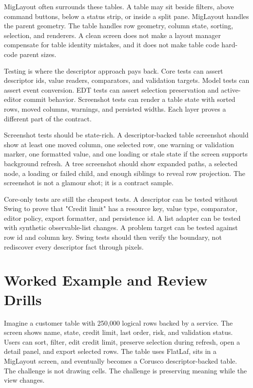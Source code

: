 MigLayout often surrounds these tables. A table may sit beside filters, above command buttons, below a status strip, or inside a split pane. MigLayout handles the parent geometry. The table handles row geometry, column state, sorting, selection, and renderers. A clean screen does not make a layout manager compensate for table identity mistakes, and it does not make table code hard-code parent sizes.

Testing is where the descriptor approach pays back. Core tests can assert descriptor ids, value readers, comparators, and validation targets. Model tests can assert event conversion. EDT tests can assert selection preservation and active-editor commit behavior. Screenshot tests can render a table state with sorted rows, moved columns, warnings, and persisted widths. Each layer proves a different part of the contract.

Screenshot tests should be state-rich. A descriptor-backed table screenshot should show at least one moved column, one selected row, one warning or validation marker, one formatted value, and one loading or stale state if the screen supports background refresh. A tree screenshot should show expanded paths, a selected node, a loading or failed child, and enough siblings to reveal row projection. The screenshot is not a glamour shot; it is a contract sample.

Core-only tests are still the cheapest tests. A descriptor can be tested without Swing to prove that "Credit limit" has a resource key, value type, comparator, editor policy, export formatter, and persistence id. A list adapter can be tested with synthetic observable-list changes. A problem target can be tested against row id and column key. Swing tests should then verify the boundary, not rediscover every descriptor fact through pixels.

\section{Worked Example and Review Drills}

Imagine a customer table with 250,000 logical rows backed by a service. The screen shows name, state, credit limit, last order, risk, and validation status. Users can sort, filter, edit credit limit, preserve selection during refresh, open a detail panel, and export selected rows. The table uses FlatLaf, sits in a MigLayout screen, and eventually becomes a Corusco descriptor-backed table. The challenge is not drawing cells. The challenge is preserving meaning while the view changes.

